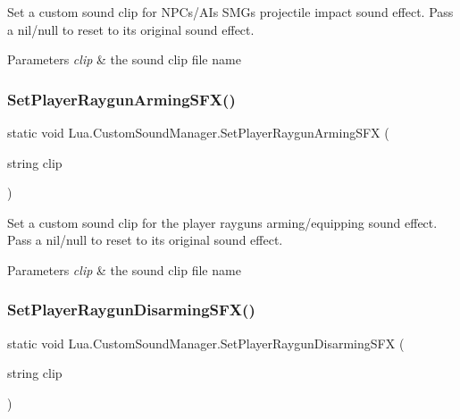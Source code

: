 Set a custom sound clip for N\+P\+Cs/\+A\+Is S\+MG\textquotesingle{}s projectile impact sound effect. Pass a nil/null to reset to its original sound effect. 


\begin{DoxyParams}{Parameters}
{\em clip} & the sound clip file name\\
\hline
\end{DoxyParams}
\mbox{\label{class_lua_1_1_custom_sound_manager_a77518b2fe52893bc0d3b7473d5ac33d8}} 
\subsubsection{\texorpdfstring{SetPlayerRaygunArmingSFX()}{SetPlayerRaygunArmingSFX()}}
{\footnotesize\ttfamily static void Lua.\+Custom\+Sound\+Manager.\+Set\+Player\+Raygun\+Arming\+S\+FX (\begin{DoxyParamCaption}\item[{string}]{clip }\end{DoxyParamCaption})\hspace{0.3cm}{\ttfamily [static]}}



Set a custom sound clip for the player raygun\textquotesingle{}s arming/equipping sound effect. Pass a nil/null to reset to its original sound effect. 


\begin{DoxyParams}{Parameters}
{\em clip} & the sound clip file name\\
\hline
\end{DoxyParams}
\mbox{\label{class_lua_1_1_custom_sound_manager_aedbcce119473f77ce87a9742c2a3bd2d}} 
\subsubsection{\texorpdfstring{SetPlayerRaygunDisarmingSFX()}{SetPlayerRaygunDisarmingSFX()}}
{\footnotesize\ttfamily static void Lua.\+Custom\+Sound\+Manager.\+Set\+Player\+Raygun\+Disarming\+S\+FX (\begin{DoxyParamCaption}\item[{string}]{clip }\end{DoxyParamCaption})\hspace{0.3cm}{\ttfamily [static]}}



